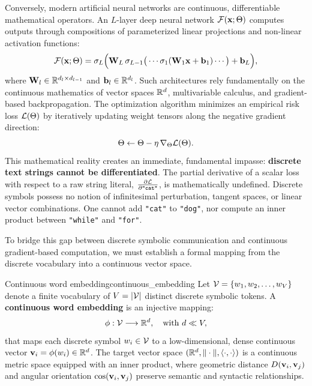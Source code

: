 \documentclass[../../main.tex]{subfiles}
\begin{document}
Conversely, modern artificial neural networks are continuous, differentiable mathematical operators. An $L$-layer deep neural network $\mathcal{F}(\mathbf{x}; \Theta)$ computes outputs through compositions of parameterized linear projections and non-linear activation functions:
\begin{equation}
\label{eq:neural_operator}
\mathcal{F}(\mathbf{x}; \Theta) = \sigma_L \Big( \mathbf{W}_L \, \sigma_{L-1}\big( \cdots \sigma_1(\mathbf{W}_1 \mathbf{x} + \mathbf{b}_1) \cdots \big) + \mathbf{b}_L \Big),
\end{equation}
where $\mathbf{W}_l \in \mathbb{R}^{d_l \times d_{l-1}}$ and $\mathbf{b}_l \in \mathbb{R}^{d_l}$. Such architectures rely fundamentally on the continuous mathematics of vector spaces $\mathbb{R}^d$, multivariable calculus, and gradient-based backpropagation. The optimization algorithm minimizes an empirical risk loss $\mathcal{L}(\Theta)$ by iteratively updating weight tensors along the negative gradient direction:
\begin{equation}
\label{eq:gradient_update_rule}
\Theta \leftarrow \Theta - \eta \, \nabla_\Theta \mathcal{L}(\Theta).
\end{equation}
This mathematical reality creates an immediate, fundamental impasse: \textbf{discrete text strings cannot be differentiated}. The partial derivative of a scalar loss with respect to a raw string literal, $\frac{\partial \mathcal{L}}{\partial \text{\texttt{"cat"}}}$, is mathematically undefined. Discrete symbols possess no notion of infinitesimal perturbation, tangent spaces, or linear vector combinations. One cannot add \texttt{"cat"} to \texttt{"dog"}, nor compute an inner product between \texttt{"while"} and \texttt{"for"}.

To bridge this gap between discrete symbolic communication and continuous gradient-based computation, we must establish a formal mapping from the discrete vocabulary into a continuous vector space.

\begin{definition}{Continuous word embedding}{continuous_embedding}
Let $\mathcal{V} = \{w_1, w_2, \dots, w_V\}$ denote a finite vocabulary of $V = |\mathcal{V}|$ distinct discrete symbolic tokens. A \textbf{continuous word embedding} is an injective mapping:
\begin{equation}
\label{eq:embedding_mapping_def}
\phi: \mathcal{V} \longrightarrow \mathbb{R}^d, \quad \text{with } d \ll V,
\end{equation}
that maps each discrete symbol $w_i \in \mathcal{V}$ to a low-dimensional, dense continuous vector $\mathbf{v}_i = \phi(w_i) \in \mathbb{R}^d$. The target vector space $(\mathbb{R}^d, \|\cdot\|, \langle\cdot, \cdot\rangle)$ is a continuous metric space equipped with an inner product, where geometric distance $D(\mathbf{v}_i, \mathbf{v}_j)$ and angular orientation $\cos(\mathbf{v}_i, \mathbf{v}_j)$ preserve semantic and syntactic relationships.
\end{definition}
\end{document}
